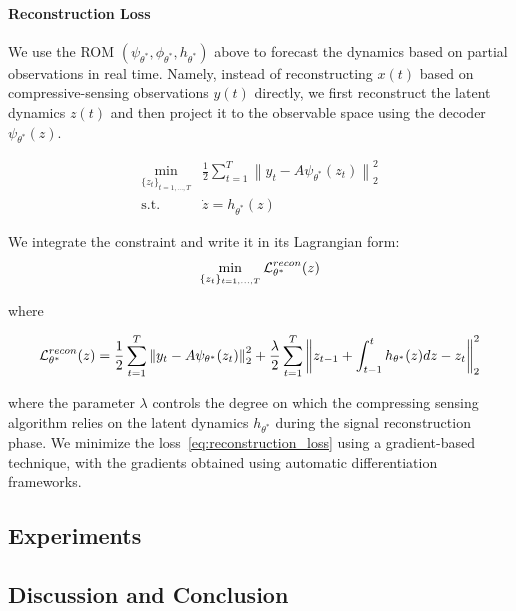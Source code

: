 \paragraph{Reconstruction Loss} 
We use the ROM $(\psi_{\theta^*}, \phi_{\theta^*}, h_{\theta^*})$ above to forecast the dynamics based on partial observations in real time. Namely, instead of reconstructing $x(t)$ based on compressive-sensing observations $y(t)$ directly, we first reconstruct the latent dynamics $z(t)$ and then project it to the observable space using the decoder $\psi_{\theta^*}(z)$.

\begin{align}
    \label{eq:reconstruction_problem_differential}
    \min_{\{z_t\}_{t=1, \dots, T}} & \frac{1}{2}\sum_{t=1}^T \left\|y_t - A\psi_{\theta^*}(z_t)\right\|_2^2 \\
    \text{s.t. } & \dot{z} = h_{\theta^*}(z)
\end{align}

We integrate the constraint and write it in its Lagrangian form:
\begin{align}
\label{eq:reconstruction_problem_integral}
    \min_{\{z_t\}_{t=1, \dots, T}} \operatorname{\mathcal{L}}_{\theta^*}^{recon}(z)
\end{align}

where 

\begin{equation}
    \label{eq:reconstruction_loss}
     \operatorname{\mathcal{L}}_{\theta^*}^{recon}(z) = \frac{1}{2}\sum_{t=1}^T \left\|y_t - A\psi_{\theta^*}(z_t)\right\|_2^2 + \frac{\lambda}{2} \sum_{t=1}^T \left\|z_{t-1} + \int_{t-1}^{t}h_{\theta^*}(z)dz - z_t\right\|_2^2
\end{equation}

where the parameter $\lambda$ controls the degree on which the compressing sensing algorithm relies on the latent dynamics $h_{\theta^*}$ during the signal reconstruction phase. We minimize the loss~\ref{eq:reconstruction_loss} using a gradient-based technique, with the gradients obtained using automatic differentiation frameworks. 

\subsection{Experiments}
\subsection{Discussion and Conclusion}
